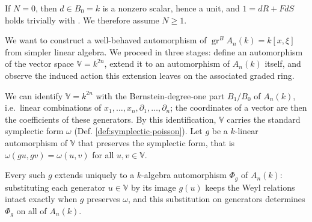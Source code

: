 \documentclass[11pt]{amsart}
\numberwithin{equation}{section}
\theoremstyle{plain}
\theoremstyle{remark}
\newcommand{\gr}{\operatorname{gr}}
\begin{document}
If $N=0$, then $d \in B_0 = k$ is a nonzero scalar, hence a unit, and $1 = dR+FdS$ holds trivially with . We therefore assume $N\geq1$.

We want to construct a well-behaved automorphism of $\gr^BA_n(k)=k[x,\xi]$
from simpler linear algebra. We proceed in three stages:
define an automorphism of the vector space $\mathbb V=k^{2n}$, extend it to
an automorphism of $A_n(k)$ itself, and observe the induced action this
extension leaves on the associated graded ring.

We can identify $\mathbb V = k^{2n}$ with the Bernstein-degree-one part $B_1/B_0$ of
$A_n(k)$, i.e.\ linear combinations of $x_1,\ldots,x_n,\partial_1,\ldots,
\partial_n$; the coordinates of a vector are then the coefficients of
these generators. By this identification, $\mathbb V$ carries the standard symplectic form $\omega$ (Def. \ref{def:symplectic-poisson}). Let $g$ be a $k$-linear automorphism of $\mathbb V$ that preserves the symplectic form, that is $\omega(gu,gv)=\omega(u,v)$ for all
$u,v\in\mathbb V$.

Every such $g$ extends uniquely to a $k$-algebra automorphism $\Phi_g$ of
$A_n(k)$: substituting each generator $u\in\mathbb V$ by its image $g(u)$
keeps the Weyl relations  intact exactly when $g$
preserves $\omega$, and this substitution on generators determines
$\Phi_g$ on all of $A_n(k)$.
\end{document}
